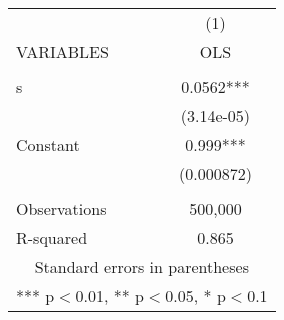 \begin{tabular}{lc} \hline
 & (1) \\
VARIABLES & OLS \\ \hline
 &  \\
s & 0.0562*** \\
 & (3.14e-05) \\
Constant & 0.999*** \\
 & (0.000872) \\
 &  \\
Observations & 500,000 \\
 R-squared & 0.865 \\ \hline
\multicolumn{2}{c}{ Standard errors in parentheses} \\
\multicolumn{2}{c}{ *** p$<$0.01, ** p$<$0.05, * p$<$0.1} \\
\end{tabular}
